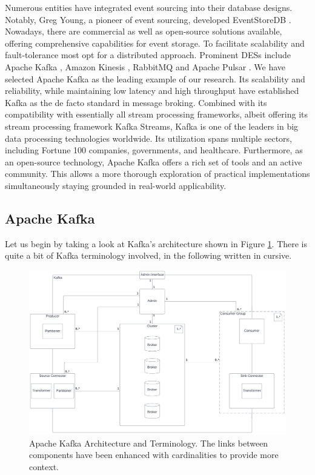 Numerous entities have integrated event sourcing into their database designs. Notably, Greg Young, a pioneer of event sourcing, developed EventStoreDB \cite{eventstore_db}. Nowadays, there are commercial as well as open-source solutions available, offering comprehensive capabilities for event storage. To facilitate scalability and fault-tolerance most opt for a distributed approach. Prominent \acp{DES} include Apache Kafka \cite{kafka}, Amazon Kinesis \cite{amazon_kinesis}, RabbitMQ \cite{rabbit_mq} and Apache Pulsar \cite{pulsar}. We have selected Apache Kafka as the leading example of our research. Its scalability and reliability, while maintaining low latency and high throughput have established Kafka as the de facto standard in message broking. Combined with its compatibility with essentially all stream processing frameworks, albeit offering its stream processing framework Kafka Streams, Kafka is one of the leaders in big data processing technologies worldwide. Its utilization spans multiple sectors, including Fortune 100 companies, governments, and healthcare. Furthermore, as an open-source technology, Apache Kafka offers
a rich set of tools and an active community. This allows a more thorough exploration of practical implementations simultaneously staying grounded in real-world applicability.

\subsection{Apache Kafka}
Let us begin by taking a look at Kafka's architecture shown in Figure \ref{fig:kafka}. There is quite a bit of Kafka terminology involved, in the following written in cursive. 

\begin{figure}[ht]
   \begin{adjustbox}{center}
   \includegraphics[width=0.8\pdfpagewidth]{img/Kafka_Diagram.pdf}
   \end{adjustbox}
   \caption{Apache Kafka Architecture and Terminology. The links between components have been enhanced with cardinalities to provide more context. \label{fig:kafka}}
\end{figure}

